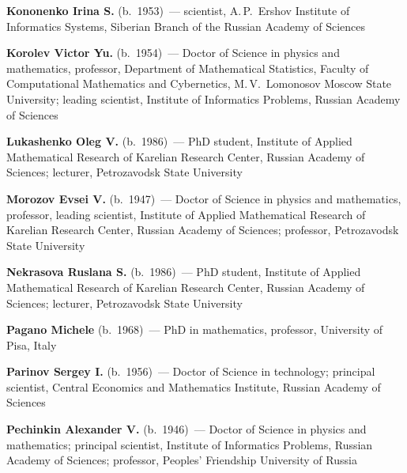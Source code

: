 \begin{multicols}{2}
\vspace*{4pt}

\noindent
\textbf{Kononenko Irina S.}  (b.\ 1953)~--- scientist, A.\,P.~Ershov Institute of 
Informatics Systems, Siberian Branch of the Russian Academy of Sciences

\vspace*{4pt}

\noindent
\textbf{Korolev Victor Yu.} (b.\ 1954)~--- Doctor of Science in physics and mathematics, 
professor, Department of Mathematical Statistics, Faculty of Computational Mathematics 
and Cybernetics, M.\,V.~Lomonosov Moscow State University; 
leading scientist, Institute of Informatics Problems, Russian Academy of Sciences


\vspace*{4pt}


\noindent
\textbf{Lukashenko Oleg V.} (b.\ 1986)~--- PhD student, 
 Institute of Applied Mathematical Research of Karelian
Research Center, Russian Academy of Sciences; lecturer, Petrozavodsk State University

\vspace*{4pt}


  \noindent
\textbf{Morozov Evsei V.} (b.\ 1947)~--- Doctor of Science in physics and 
mathematics, professor, leading scientist, 
 Institute of Applied Mathematical Research of Karelian
Research Center, Russian Academy of Sciences; professor,  Petrozavodsk State University


\columnbreak

\noindent
\textbf{Nekrasova Ruslana S.} (b.\ 1986)~--- PhD student, 
Institute of Applied Mathematical Research of Karelian
Research Center, Russian Academy of Sciences; lecturer, Petrozavodsk State University



\vspace*{5pt}

\noindent
\textbf{Pagano Michele} (b.\ 1968)~--- PhD in mathematics, professor, University of Pisa, Italy

\vspace*{5pt}

\noindent
\textbf{Parinov Sergey I.} (b.\ 1956)~--- Doctor of Science in technology; principal
scientist, Central Economics and Mathematics Institute, Russian Academy of Sciences

\vspace*{5pt}

\noindent
\textbf{Pechinkin Alexander V.} (b.\ 1946)~--- Doctor of Science in physics and mathematics;
principal scientist, Institute of Informatics Problems, Russian Academy of
Sciences; professor, Peoples' Friendship University of Russia


\end{multicols}
